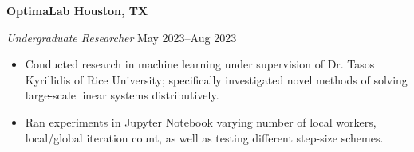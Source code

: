 \textbf{OptimaLab \hfill Houston, TX}\par
\textit{Undergraduate Researcher} \hfill May 2023--Aug 2023

\begin{itemize}
	\item Conducted research in machine learning under supervision of Dr. Tasos Kyrillidis of Rice University; specifically investigated novel methods of solving large-scale linear systems distributively.
	\item Ran experiments in Jupyter Notebook varying number of local workers, local/global iteration count, as well as testing different step-size schemes.
\end{itemize}\par